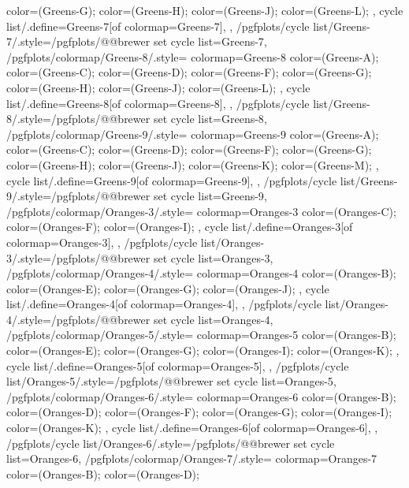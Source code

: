 {{{      color=(Greens-G);
      color=(Greens-H);
      color=(Greens-J);
      color=(Greens-L);
    },
    cycle list/.define={Greens-7}{[of colormap=Greens-7]},
  },
  /pgfplots/cycle list/Greens-7/.style={/pgfplots/@@brewer set cycle list={Greens-7}},
  /pgfplots/colormap/Greens-8/.style={
    colormap={Greens-8}{
      color=(Greens-A);
      color=(Greens-C);
      color=(Greens-D);
      color=(Greens-F);
      color=(Greens-G);
      color=(Greens-H);
      color=(Greens-J);
      color=(Greens-L);
    },
    cycle list/.define={Greens-8}{[of colormap=Greens-8]},
  },
  /pgfplots/cycle list/Greens-8/.style={/pgfplots/@@brewer set cycle list={Greens-8}},
  /pgfplots/colormap/Greens-9/.style={
    colormap={Greens-9}{
      color=(Greens-A);
      color=(Greens-C);
      color=(Greens-D);
      color=(Greens-F);
      color=(Greens-G);
      color=(Greens-H);
      color=(Greens-J);
      color=(Greens-K);
      color=(Greens-M);
    },
    cycle list/.define={Greens-9}{[of colormap=Greens-9]},
  },
  /pgfplots/cycle list/Greens-9/.style={/pgfplots/@@brewer set cycle list={Greens-9}},
  /pgfplots/colormap/Oranges-3/.style={
    colormap={Oranges-3}{
      color=(Oranges-C);
      color=(Oranges-F);
      color=(Oranges-I);
    },
    cycle list/.define={Oranges-3}{[of colormap=Oranges-3]},
  },
  /pgfplots/cycle list/Oranges-3/.style={/pgfplots/@@brewer set cycle list={Oranges-3}},
  /pgfplots/colormap/Oranges-4/.style={
    colormap={Oranges-4}{
      color=(Oranges-B);
      color=(Oranges-E);
      color=(Oranges-G);
      color=(Oranges-J);
    },
    cycle list/.define={Oranges-4}{[of colormap=Oranges-4]},
  },
  /pgfplots/cycle list/Oranges-4/.style={/pgfplots/@@brewer set cycle list={Oranges-4}},
  /pgfplots/colormap/Oranges-5/.style={
    colormap={Oranges-5}{
      color=(Oranges-B);
      color=(Oranges-E);
      color=(Oranges-G);
      color=(Oranges-I);
      color=(Oranges-K);
    },
    cycle list/.define={Oranges-5}{[of colormap=Oranges-5]},
  },
  /pgfplots/cycle list/Oranges-5/.style={/pgfplots/@@brewer set cycle list={Oranges-5}},
  /pgfplots/colormap/Oranges-6/.style={
    colormap={Oranges-6}{
      color=(Oranges-B);
      color=(Oranges-D);
      color=(Oranges-F);
      color=(Oranges-G);
      color=(Oranges-I);
      color=(Oranges-K);
    },
    cycle list/.define={Oranges-6}{[of colormap=Oranges-6]},
  },
  /pgfplots/cycle list/Oranges-6/.style={/pgfplots/@@brewer set cycle list={Oranges-6}},
  /pgfplots/colormap/Oranges-7/.style={
    colormap={Oranges-7}{
      color=(Oranges-B);
      color=(Oranges-D);
}}}
